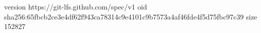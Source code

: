 version https://git-lfs.github.com/spec/v1
oid sha256:65fbcb2ce3e4df62f943ca78314c9e4101c9b7573a4af46fde4f5d75fbc97c39
size 152827
